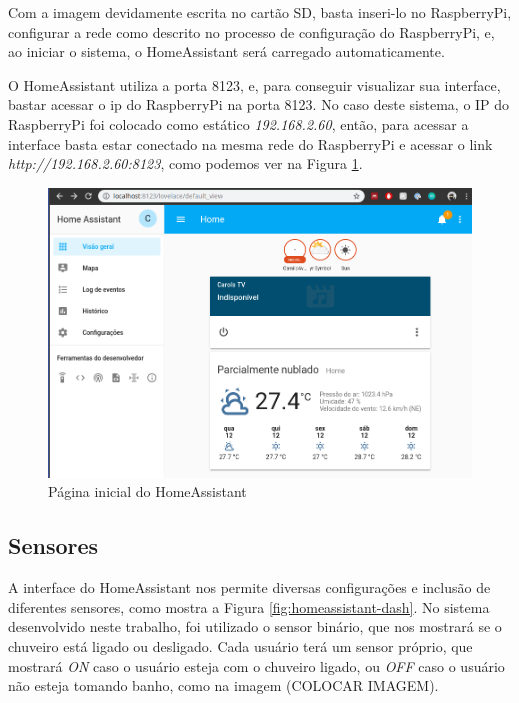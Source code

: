 Com a imagem devidamente escrita no cartão SD, basta inseri-lo no RaspberryPi, configurar a rede como descrito no processo de configuração do RaspberryPi, e, ao iniciar o sistema, o HomeAssistant será carregado automaticamente.

O HomeAssistant utiliza a porta 8123, e, para conseguir visualizar sua interface, bastar acessar o ip do RaspberryPi na porta 8123. No caso deste sistema, o IP do RaspberryPi foi colocado como estático \textit{192.168.2.60}, então, para acessar a interface basta estar conectado na mesma rede do RaspberryPi e acessar o link \textit{http://192.168.2.60:8123}, como podemos ver na Figura \ref{fig:homeassistanthome}.

\begin{figure}[htbp]
	\centering
	\includegraphics[width=1\linewidth]{figuras/homeassistanthome.png}
	\caption{Página inicial do HomeAssistant}
	\label{fig:homeassistanthome}
\end{figure}

\subsection{Sensores}

A interface do HomeAssistant nos permite diversas configurações e inclusão de diferentes sensores, como mostra a Figura \ref{fig:homeassistant-dash}. No sistema desenvolvido neste trabalho, foi utilizado o sensor binário, que nos mostrará se o chuveiro está ligado ou desligado. Cada usuário terá um sensor próprio, que mostrará \textit{ON} caso o usuário esteja com o chuveiro ligado, ou \textit{OFF} caso o usuário não esteja tomando banho, como na imagem (COLOCAR IMAGEM).


